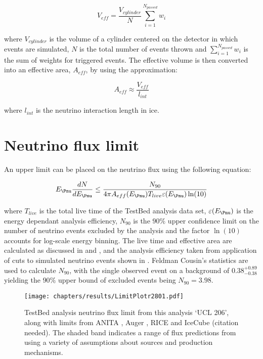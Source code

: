\begin{equation}
  V_{eff} = \frac {V_{cylinder}}{N} \sum_{i=1}^{N_{passed}} w_{i}
\end{equation}

\noindent where $V_{cylinder}$ is the volume of a cylinder centered on the detector in which events are simulated, $N$ is the total number of events thrown and $\sum_{i=1}^{N_{passed}} w_{i}$ is the sum of weights for triggered events. The effective volume is then converted into an effective area, $A_{eff}$, by using the approximation:

\begin{equation}
  A_{eff} \approx \frac{V_{eff}}{l_{int}}
\end{equation}

\noindent where $l_{int}$ is the neutrino interaction length in ice. 

\section{Neutrino flux limit}
\label{sec:Results:Limit}

An upper limit can be placed on the neutrino flux using the following equation:

\begin{equation}
  E_{\Pnu} \frac {dN}{dE_{\Pnu}} \leq \frac{N_{90}}{4\pi A_{eff}(E_{\Pnu}) T_{live} \varepsilon(E_{\Pnu}) \ln(10)}
\end{equation}

\noindent where $T_{live}$ is the total live time of the TestBed analysis data set, $\varepsilon(E_{\Pnu})$ is the energy dependant analysis efficiency, $N_{90}$ is the $90\%$ upper confidence limit on the number of neutrino events excluded by the analysis and the factor $\ln(10)$ accounts for log-scale energy binning. The live time and effective area are calculated as discussed in  and , and the analysis efficiency taken from application of cuts to simulated neutrino events shown in . Feldman Cousin's statistics are used to calculate $N_{90}$, with the single observed event on a background of $0.38^{+0.89}_{-0.38}$ yielding the $90\%$ upper bound of excluded events being $N_{90}=3.98$.

\begin{figure}[htpb]
  \texttt{[image: chapters/results/LimitPlotr2801.pdf]}
  \caption{TestBed analysis neutrino flux limit from this analysis `UCL 206', along with limits from ANITA \cite{Gorham:2010kv}, Auger \cite{Abraham:2009eh}, RICE \cite{PhysRevD.73.082002} and IceCube (citation needed). The shaded band indicates a range of flux predictions from \cite{Kotera.2010} using a variety of assumptions about sources and production mechanisms.}
  \label{fig:Results:Limit-Plot}
\end{figure}

